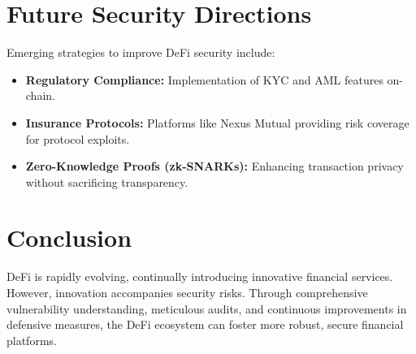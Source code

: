 \documentclass[conference]{IEEEtran}
\begin{document}
\section{Future Security Directions}
Emerging strategies to improve DeFi security include:
\begin{itemize}
\item \textbf{Regulatory Compliance:} Implementation of KYC and AML features on-chain.
\item \textbf{Insurance Protocols:} Platforms like Nexus Mutual providing risk coverage for protocol exploits.
\item \textbf{Zero-Knowledge Proofs (zk-SNARKs):} Enhancing transaction privacy without sacrificing transparency.
\end{itemize}

\section{Conclusion}
DeFi is rapidly evolving, continually introducing innovative financial services. However, innovation accompanies security risks. Through comprehensive vulnerability understanding, meticulous audits, and continuous improvements in defensive measures, the DeFi ecosystem can foster more robust, secure financial platforms.



\end{document}

